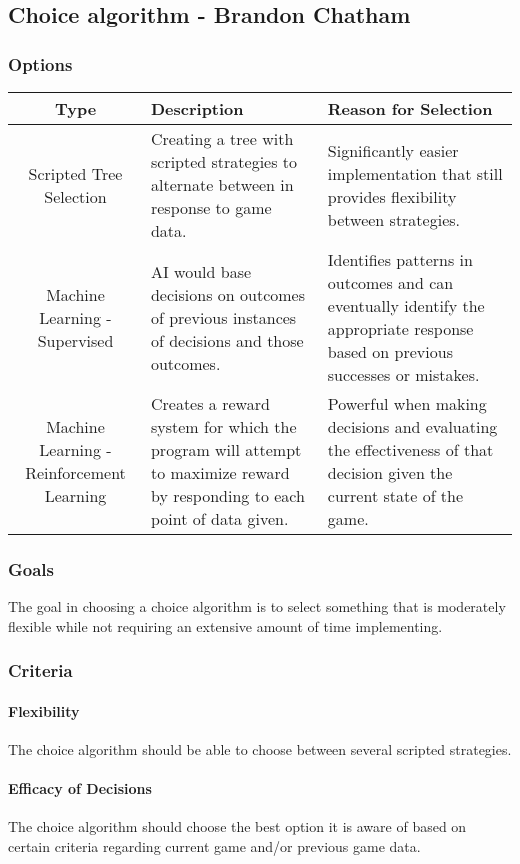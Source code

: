 \subsection{Choice algorithm - Brandon Chatham}
\subsubsection{Options}
\begin{center}
	\begin{tabular}{ ||C|L|L|| } 
		\hline
		Type & Description & Reason for Selection \\
		\hline
		Scripted Tree Selection & Creating a tree with scripted strategies to alternate between in response to game data. & Significantly easier implementation that still provides flexibility between strategies. \\ 
		\hline
		Machine Learning - Supervised & AI would base decisions on outcomes of previous instances of decisions and those outcomes. & Identifies patterns in outcomes and can eventually identify the appropriate response based on previous successes or mistakes. \\ 
		\hline
		Machine Learning - Reinforcement Learning & Creates a reward system for which the program will attempt to maximize reward by responding to each point of data given. & Powerful when making decisions and evaluating the effectiveness of that decision given the current state of the game. \\ 
		\hline
	\end{tabular}
\end{center}
\subsubsection{Goals}
The goal in choosing a choice algorithm is to select something that is moderately flexible while not requiring an extensive amount of time implementing.
\subsubsection{Criteria}
\paragraph{Flexibility}
The choice algorithm should be able to choose between several scripted strategies.
\paragraph{Efficacy of Decisions}
The choice algorithm should choose the best option it is aware of based on certain criteria regarding current game and/or previous game data.
